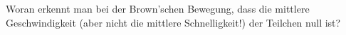 Woran erkennt man bei der Brown'schen Bewegung, dass die mittlere Geschwindigkeit (aber nicht die mittlere Schnelligkeit!) der Teilchen null ist?
